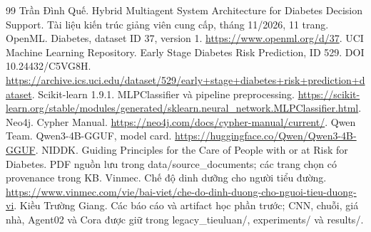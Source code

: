 \begin{thebibliography}{99}
 Trần Đình Quế. Hybrid Multiagent System Architecture for Diabetes Decision Support. Tài liệu kiến trúc giảng viên cung cấp, tháng 11/2026, 11 trang.
 OpenML. Diabetes, dataset ID 37, version 1. \url{https://www.openml.org/d/37}.
 UCI Machine Learning Repository. Early Stage Diabetes Risk Prediction, ID 529. DOI 10.24432/C5VG8H. \url{https://archive.ics.uci.edu/dataset/529/early+stage+diabetes+risk+prediction+dataset}.
 Scikit-learn 1.9.1. MLPClassifier và pipeline preprocessing. \url{https://scikit-learn.org/stable/modules/generated/sklearn.neural_network.MLPClassifier.html}.
 Neo4j. Cypher Manual. \url{https://neo4j.com/docs/cypher-manual/current/}.
 Qwen Team. Qwen3-4B-GGUF, model card. \url{https://huggingface.co/Qwen/Qwen3-4B-GGUF}.
 NIDDK. Guiding Principles for the Care of People with or at Risk for Diabetes. PDF nguồn lưu trong data/source\_documents; các trang chọn có provenance trong KB.
 Vinmec. Chế độ dinh dưỡng cho người tiểu đường. \url{https://www.vinmec.com/vie/bai-viet/che-do-dinh-duong-cho-nguoi-tieu-duong-vi}.
 Kiều Trường Giang. Các báo cáo và artifact học phần trước; CNN, chuỗi, giá nhà, Agent02 và Cora được giữ trong legacy\_tieuluan/, experiments/ và results/.
\end{thebibliography}
